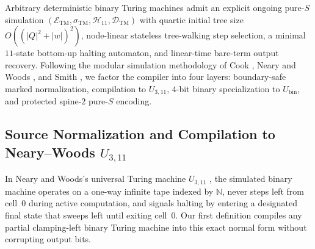 \documentclass[11pt,reqno]{amsart}
\numberwithin{equation}{section}
\theoremstyle{plain}
\theoremstyle{definition}
\theoremstyle{remark}
\begin{document}
Arbitrary deterministic binary Turing machines admit an explicit ongoing pure-$S$ simulation $(\mathcal{E}_{\mathrm{TM}}, \sigma_{\mathrm{TM}}, \mathcal{H}_{11}, \mathcal{D}_{\mathrm{TM}})$ with quartic initial tree size $O((|Q|^2 + |w|)^2)$, node-linear stateless tree-walking step selection, a minimal $11$-state bottom-up halting automaton, and linear-time bare-term output recovery. Following the modular simulation methodology of Cook \cite{Cook2004Rule110}, Neary and Woods \cite{NearyWoods2006SmallFast,Neary2008Thesis}, and Smith \cite{Smith2020TM23}, we factor the compiler into four layers: boundary-safe marked normalization, compilation to $U_{3,11}$, $4$-bit binary specialization to $U_{\mathrm{bin}}$, and protected spine-$2$ pure-$S$ encoding.

\subsection{Source Normalization and Compilation to Neary--Woods \texorpdfstring{$U_{3,11}$}{U\_\{3,11\}}}\label{subsec:u311}

In Neary and Woods's universal Turing machine $U_{3,11}$ \cite{NearyWoods2006SmallFast,Neary2008Thesis}, the simulated binary machine operates on a one-way infinite tape indexed by $\mathbb{N}$, never steps left from cell~$0$ during active computation, and signals halting by entering a designated final state that sweeps left until exiting cell~$0$. Our first definition compiles any partial clamping-left binary Turing machine into this exact normal form without corrupting output bits.
\end{document}
